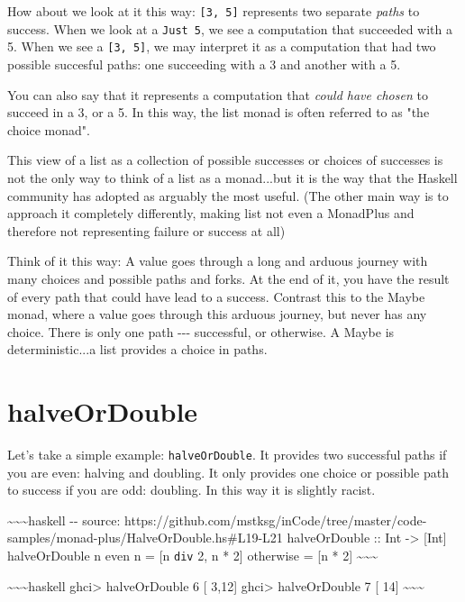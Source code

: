 \documentclass[]{article}
\begin{document}
How about we look at it this way: \texttt{{[}3,\ 5{]}} represents two separate
\emph{paths} to success. When we look at a \texttt{Just\ 5}, we see a
computation that succeeded with a 5. When we see a \texttt{{[}3,\ 5{]}}, we may
interpret it as a computation that had two possible succesful paths: one
succeeding with a 3 and another with a 5.

You can also say that it represents a computation that \emph{could have chosen}
to succeed in a 3, or a 5. In this way, the list monad is often referred to as
"the choice monad".

This view of a list as a collection of possible successes or choices of
successes is not the only way to think of a list as a monad...but it is the way
that the Haskell community has adopted as arguably the most useful. (The other
main way is to approach it completely differently, making list not even a
MonadPlus and therefore not representing failure or success at all)

Think of it this way: A value goes through a long and arduous journey with many
choices and possible paths and forks. At the end of it, you have the result of
every path that could have lead to a success. Contrast this to the Maybe monad,
where a value goes through this arduous journey, but never has any choice. There
is only one path -\/-\/- successful, or otherwise. A Maybe is deterministic...a
list provides a choice in paths.

\section{halveOrDouble}

Let's take a simple example: \texttt{halveOrDouble}. It provides two successful
paths if you are even: halving and doubling. It only provides one choice or
possible path to success if you are odd: doubling. In this way it is slightly
racist.

\textasciitilde{}\textasciitilde{}\textasciitilde{}haskell -\/- source:
https://github.com/mstksg/inCode/tree/master/code-samples/monad-plus/HalveOrDouble.hs\#L19-L21
halveOrDouble :: Int -\textgreater{} {[}Int{]} halveOrDouble n \textbar{} even n
= {[}n \texttt{div} 2, n * 2{]} \textbar{} otherwise = {[}n * 2{]}
\textasciitilde{}\textasciitilde{}\textasciitilde{}

\textasciitilde{}\textasciitilde{}\textasciitilde{}haskell ghci\textgreater{}
halveOrDouble 6 {[} 3,12{]} ghci\textgreater{} halveOrDouble 7 {[} 14{]}
\textasciitilde{}\textasciitilde{}\textasciitilde{}
\end{document}

